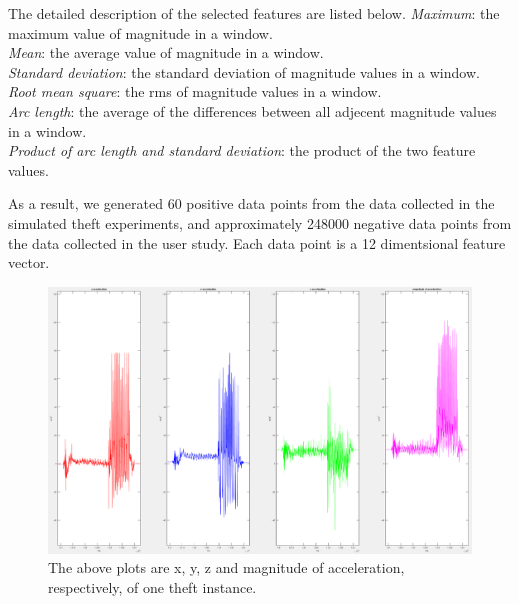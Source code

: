 \documentclass{soups}
\begin{document}
The detailed description of the selected features are listed below.
\textit{Maximum}: the maximum value of magnitude in a window. \\
\textit{Mean}: the average value of magnitude in a window. \\
\textit{Standard deviation}: the standard deviation of magnitude values in a window. \\
\textit{Root mean square}: the rms of magnitude values in a window. \\
\textit{Arc length}: the average of the differences between all adjecent magnitude values in a window. \\
\textit{Product of arc length and standard deviation}: the product of the two feature values.

As a result, we generated 60 positive data points from the data collected in the simulated theft experiments, and approximately 248000 negative data points from the data collected in the user study. Each data point is a 12 dimentsional feature vector.



\begin{figure}[H]
\includegraphics[width=1.0\columnwidth]{pos_acc_separated.png}
\caption{The above plots are x, y, z and magnitude of acceleration, respectively, of one theft instance.}
\end{figure}
\end{document}
